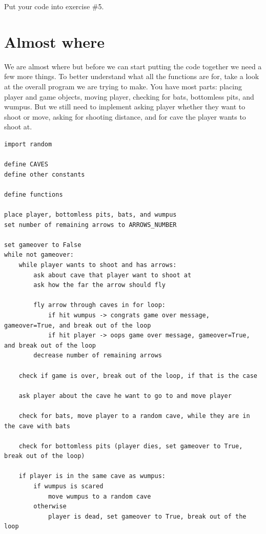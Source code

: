 \documentclass[
]{book}
\begin{document}
Put your code into exercise \#5.

\hypertarget{almost-where}{%
\section{Almost where}\label{almost-where}}

We are almost where but before we can start putting the code together we need a few more things. To better understand what all the functions are for, take a look at the overall program we are trying to make. You have most parts: placing player and game objects, moving player, checking for bats, bottomless pits, and wumpus. But we still need to implement asking player whether they want to shoot or move, asking for shooting distance, and for cave the player wants to shoot at.

\begin{verbatim}
import random

define CAVES
define other constants

define functions 

place player, bottomless pits, bats, and wumpus
set number of remaining arrows to ARROWS_NUMBER

set gameover to False
while not gameover:
    while player wants to shoot and has arrows:
        ask about cave that player want to shoot at
        ask how the far the arrow should fly
        
        fly arrow through caves in for loop:
            if hit wumpus -> congrats game over message, gameover=True, and break out of the loop
            if hit player -> oops game over message, gameover=True, and break out of the loop
        decrease number of remaining arrows
        
    check if game is over, break out of the loop, if that is the case
        
    ask player about the cave he want to go to and move player
    
    check for bats, move player to a random cave, while they are in the cave with bats
    
    check for bottomless pits (player dies, set gameover to True, break out of the loop)
    
    if player is in the same cave as wumpus:
        if wumpus is scared
            move wumpus to a random cave
        otherwise
            player is dead, set gameover to True, break out of the loop
\end{verbatim}
\end{document}
